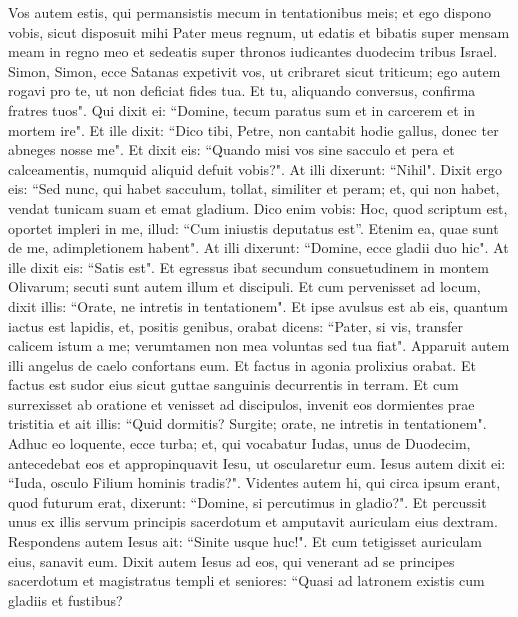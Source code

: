 \begin{biblechapter}
\verse Vos autem estis, qui permansistis mecum in tentationibus meis; 
\verse et ego dispono vobis, sicut disposuit mihi Pater meus regnum, 
\verse ut edatis et bibatis super mensam meam in regno meo et sedeatis super thronos iudicantes duodecim tribus Israel. 
\verse Simon, Simon, ecce Satanas expetivit vos, ut cribraret sicut triticum; 
\verse ego autem rogavi pro te, ut non deficiat fides tua. Et tu, aliquando conversus, confirma fratres tuos". 
\verse Qui dixit ei: “Domine, tecum paratus sum et in carcerem et in mortem ire". 
\verse Et ille dixit: “Dico tibi, Petre, non cantabit hodie gallus, donec ter abneges nosse me". 
\verse Et dixit eis: “Quando misi vos sine sacculo et pera et calceamentis, numquid aliquid defuit vobis?". At illi dixerunt: “Nihil". 
\verse Dixit ergo eis: “Sed nunc, qui habet sacculum, tollat, similiter et peram; et, qui non habet, vendat tunicam suam et emat gladium. 
\verse Dico enim vobis: Hoc, quod scriptum est, oportet impleri in me, illud: “Cum iniustis deputatus est”. Etenim ea, quae sunt de me, adimpletionem habent". 
\verse At illi dixerunt: “Domine, ecce gladii duo hic". At ille dixit eis: “Satis est". 
\verse Et egressus ibat secundum consuetudinem in montem Olivarum; secuti sunt autem illum et discipuli. 
\verse Et cum pervenisset ad locum, dixit illis: “Orate, ne intretis in tentationem". 
\verse Et ipse avulsus est ab eis, quantum iactus est lapidis, et, positis genibus, orabat 
\verse dicens: “Pater, si vis, transfer calicem istum a me; verumtamen non mea voluntas sed tua fiat". 
\verse Apparuit autem illi angelus de caelo confortans eum. Et factus in agonia prolixius orabat. 
\verse Et factus est sudor eius sicut guttae sanguinis decurrentis in terram. 
\verse Et cum surrexisset ab oratione et venisset ad discipulos, invenit eos dormientes prae tristitia 
\verse et ait illis: “Quid dormitis? Surgite; orate, ne intretis in tentationem". 
\verse Adhuc eo loquente, ecce turba; et, qui vocabatur Iudas, unus de Duodecim, antecedebat eos et appropinquavit Iesu, ut oscularetur eum. 
\verse Iesus autem dixit ei: “Iuda, osculo Filium hominis tradis?". 
\verse Videntes autem hi, qui circa ipsum erant, quod futurum erat, dixerunt: “Domine, si percutimus in gladio?". 
\verse Et percussit unus ex illis servum principis sacerdotum et amputavit auriculam eius dextram. 
\verse Respondens autem Iesus ait: “Sinite usque huc!". Et cum tetigisset auriculam eius, sanavit eum. 
\verse Dixit autem Iesus ad eos, qui venerant ad se principes sacerdotum et magistratus templi et seniores: “Quasi ad latronem existis cum gladiis et fustibus? 

\end{biblechapter}
